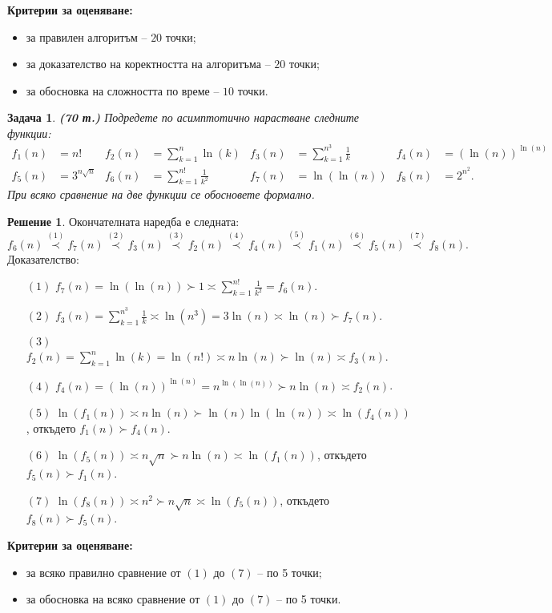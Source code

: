 \documentclass{article}
\newtheorem{problem}{Задача}
\theoremstyle{definition}
\newtheorem*{solution}{Решение}
\begin{document}
\textbf{Критерии за оценяване:}
\begin{itemize}
    \item за правилен алгоритъм -- $20$ точки;
    \item за доказателство на коректността на алгоритъма -- $20$ точки;
    \item за обосновка на сложността по време -- $10$ точки.
\end{itemize}

\pagebreak

\begin{problem} {\bf (70 т.)}
Подредете по асимптотично нарастване следните \\ функции:
\begin{align*}
    f_1(n) & = n!             & f_2(n) & = \sum\limits_{k = 1}^{n} \ln(k)         & f_3(n) & = \sum\limits_{k = 1}^{n^3} \frac{1}{k} & f_4(n) & = (\ln(n))^{\ln(n)} \\
    f_5(n) & = 3^{n \sqrt{n}} & f_6(n) & = \sum\limits_{k = 1}^{n!} \frac{1}{k^2} & f_7(n) & = \ln(\ln(n))                           & f_8(n) & = 2^{n^2}.
\end{align*}
При всяко сравнение на две функции се обосновете формално.
\end{problem}

\begin{solution}
    Окончателната наредба е следната:
    \[
        f_6(n) \stackrel{(1)}{\prec} f_7(n) \stackrel{(2)}{\prec} f_3(n) \stackrel{(3)}{\prec} f_2(n) \stackrel{(4)}{\prec} f_4(n) \stackrel{(5)}{\prec} f_1(n) \stackrel{(6)}{\prec} f_5(n) \stackrel{(7)}{\prec} f_8(n).
    \]
    Доказателство:
    \begin{itemize}
        \item[$(1)$] $f_7(n) = \ln(\ln(n)) \succ 1 \asymp \sum\limits_{k = 1}^{n!} \frac{1}{k^2} = f_6(n)$.
        \item[$(2)$] $f_3(n) = \sum\limits_{k = 1}^{n^3} \frac{1}{k} \asymp \ln(n^3) = 3 \ln(n) \asymp \ln(n) \succ f_7(n)$.
        \item[$(3)$] $f_2(n) = \sum\limits_{k = 1}^{n} \ln(k) = \ln(n!) \asymp n \ln(n) \succ \ln(n) \asymp f_3(n)$.
        \item[$(4)$] $f_4(n) = (\ln(n))^{\ln(n)} = n^{\ln(\ln(n))} \succ n \ln(n) \asymp f_2(n)$.
        \item[$(5)$] $\ln(f_1(n)) \asymp n \ln(n) \succ \ln(n) \ln(\ln(n)) \asymp \ln(f_4(n))$, откъдето $f_1(n) \succ f_4(n)$.
        \item[$(6)$] $\ln(f_5(n)) \asymp n \sqrt{n} \succ n \ln(n) \asymp \ln(f_1(n))$, откъдето $f_5(n) \succ f_1(n)$.
        \item[$(7)$] $\ln(f_8(n)) \asymp n^2 \succ n \sqrt{n} \asymp \ln(f_5(n))$, откъдето $f_8(n) \succ f_5(n)$.
    \end{itemize}
\end{solution}

\textbf{Критерии за оценяване:}
\begin{itemize}
    \item за всяко правилно сравнение от $(1)$ до $(7)$ -- по 5 точки;
    \item за обосновка на всяко сравнение от $(1)$ до $(7)$ -- по 5 точки.
\end{itemize}
\end{document}
